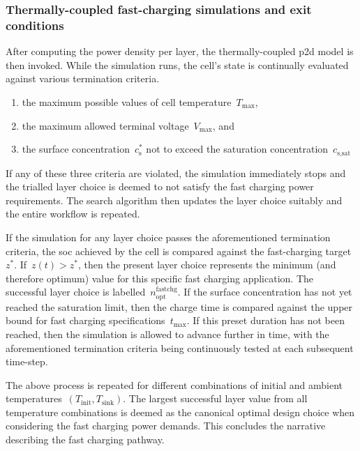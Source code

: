 \subsubsection*{Thermally-coupled fast-charging simulations and exit conditions}

After computing  the power  density per  layer, the  thermally-coupled \gls{p2d}
model  is  then  invoked.  While  the  simulation  runs,  the  cell's  state  is
continually evaluated against various termination criteria.
\begin{enumerate}
    \item the maximum possible values of cell temperature~$T_\text{max}$,
    \item the maximum allowed terminal voltage~$V_\text{max}$, and
    \item the surface concentration~$c_\text{s}^{\ast}$ not to exceed the saturation concentration~$c_\text{s,sat}$
\end{enumerate}

If any  of these three criteria  are violated, the simulation  immediately stops
and the trialled layer  choice is deemed to not satisfy  the fast charging power
requirements. The  search algorithm then  updates the layer choice  suitably and
the entire workflow is repeated.

If the  simulation for  any layer choice  passes the  aforementioned termination
criteria,  the  \gls{soc}   achieved  by  the  cell  is   compared  against  the
fast-charging   target~$z^\ast$.  If~${z(t)   >  z^\ast}$,   then  the   present
layer  choice  represents   the  minimum  (and  therefore   optimum)  value  for
this  specific  fast  charging  application.  The  successful  layer  choice  is
labelled~$n_\text{opt}^\text{fastchg}$. If the surface concentration has not yet
reached the saturation limit, then the charge time is compared against the upper
bound for  fast charging specifications~$t_\text{max}$. If  this preset duration
has not been reached, then the simulation is allowed to advance further in time,
with the aforementioned  termination criteria being continuously  tested at each
subsequent time-step.

The above process is repeated for  different combinations of initial and ambient
temperatures~${(T_\text{init},  T_\text{sink})}$.  The  largest  successful
layer value from all temperature combinations is deemed as the canonical optimal
design choice when  considering the fast charging power  demands. This concludes
the  narrative describing  the  fast charging  pathway.

